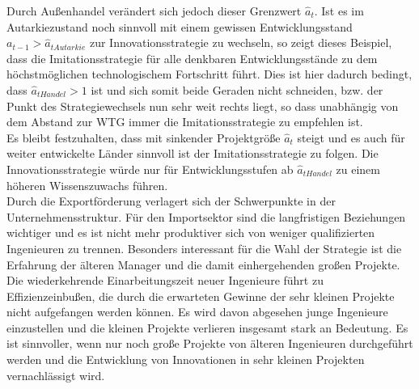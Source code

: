 Durch Außenhandel verändert sich jedoch dieser Grenzwert $\hat{a}_t$. Ist es im Autarkiezustand noch sinnvoll mit einem gewissen Entwicklungsstand $a_{t-1}>\hat{a}_{tAutarkie}$ zur \textcolor[rgb]{0.74,0.97,0.22}{Innovationsstrategie} zu wechseln, so zeigt dieses Beispiel, dass die \textcolor[rgb]{0,0.32,0}{Imitationsstrategie} für alle denkbaren Entwicklungsstände zu dem höchstmöglichen technologischem Fortschritt führt. Dies ist hier dadurch bedingt, dass $\hat{a}_{tHandel}>1$ ist und sich somit beide Geraden nicht schneiden, bzw. der Punkt des Strategiewechsels nun sehr weit rechts liegt, so dass unabhängig von dem Abstand zur WTG immer die \textcolor[rgb]{0,0.32,0}{Imitationsstrategie} zu empfehlen ist.\\


Es bleibt festzuhalten, dass mit sinkender Projektgröße  $\hat{a}_t$ steigt und es auch für weiter entwickelte Länder sinnvoll ist der \textcolor[rgb]{0,0.32,0}{Imitationsstrategie} zu folgen. Die \textcolor[rgb]{0.74,0.97,0.22}{Innovationsstrategie} würde nur für Entwicklungsstufen ab $\hat{a}_{tHandel}$ zu einem höheren Wissenszuwachs führen. \\


Durch die Exportförderung verlagert sich der Schwerpunkte in der Unternehmensstruktur. Für den Importsektor sind die langfristigen Beziehungen wichtiger und es ist nicht mehr produktiver sich von weniger qualifizierten Ingenieuren zu trennen. Besonders interessant für die Wahl der Strategie ist die Erfahrung der älteren Manager und die damit einhergehenden großen Projekte. Die wiederkehrende Einarbeitungszeit neuer Ingenieure führt zu Effizienzeinbußen, die durch die erwarteten Gewinne der sehr kleinen Projekte nicht aufgefangen werden können. Es wird davon abgesehen junge Ingenieure einzustellen und die kleinen Projekte verlieren insgesamt stark an Bedeutung. Es ist sinnvoller, wenn nur noch große Projekte von älteren Ingenieuren durchgeführt werden und die Entwicklung von Innovationen in sehr kleinen Projekten vernachlässigt wird.\\

